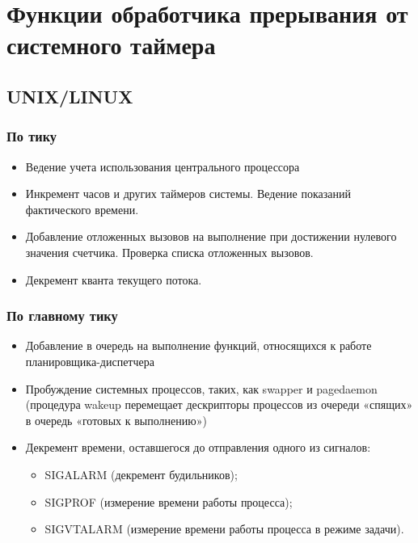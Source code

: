 \section{Функции обработчика прерывания от системного таймера}

\subsection{UNIX/LINUX}

\subsubsection{По тику}

\begin{itemize}
    \item Ведение учета использования центрального процессора
    \item Инкремент часов и других таймеров системы. Ведение
        показаний фактического времени.
    \item Добавление отложенных вызовов на выполнение при
        достижении нулевого значения счетчика. Проверка списка отложенных вызовов.
    \item Декремент кванта текущего потока.
\end{itemize}

\subsubsection{По главному тику}

\begin{itemize}
    \item Добавление в очередь на выполнение функций,
        относящихся к работе планировщика-диспетчера
    \item Пробуждение системных процессов, таких, как
        swapper и pagedaemon (процедура wakeup перемещает
        дескрипторы процессов из очереди «спящих» в очередь
        «готовых к выполнению»)
    \item Декремент времени, оставшегося до отправления одного
        из сигналов:

        \begin{itemize}
            \item { \ttfamily SIGALARM }
                (декремент будильников);
            \item { \ttfamily SIGPROF }
                (измерение времени работы процесса);
            \item {\ttfamily SIGVTALARM }
                (измерение времени работы процесса в режиме задачи).
        \end{itemize}
\end{itemize}

